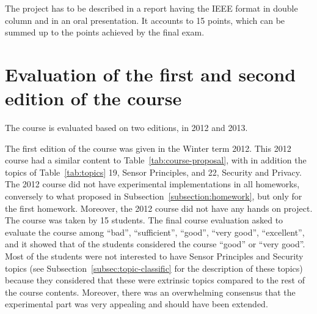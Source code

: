\documentclass[onecolumn,12pt,draftclsnofoot,a4paper,peerreview]{IEEEtran}
\begin{document}
The project has to be described in a report having the IEEE format in double column and in an oral presentation. It accounts to 15 points, which can be summed up to the points achieved by the final exam. 

\section{Evaluation of the first and second edition of the course} 

The course is evaluated based on two editions, in 2012 and 2013. 

The first edition of the course was given in the Winter term 2012. This 2012 course had a similar content to Table~\ref{tab:course-proposal}, with in addition the topics of Table~\ref{tab:topics} 19, Sensor Principles, and 22, Security and Privacy. The 2012 course did not have experimental implementations in all homeworks, conversely to what proposed in Subsection~\ref{subsection:homework}, but only for the first homework. Moreover, the 2012 course did not have any hands on project. The course was taken by 15 students. The final course evaluation asked to evaluate the course among ``bad'', ``sufficient'', ``good'', ``very good'', ``excellent'', and it showed that  of the students considered the course ``good'' or ``very good''. Most of the students were not interested to have Sensor Principles and Security topics (see Subsection~\ref{subsec:topic-classific} for the description of these topics) because they considered that these were extrinsic topics compared to the rest of the course contents. Moreover, there was an overwhelming consensus that the experimental part was very appealing and should have been extended. 
\end{document}
